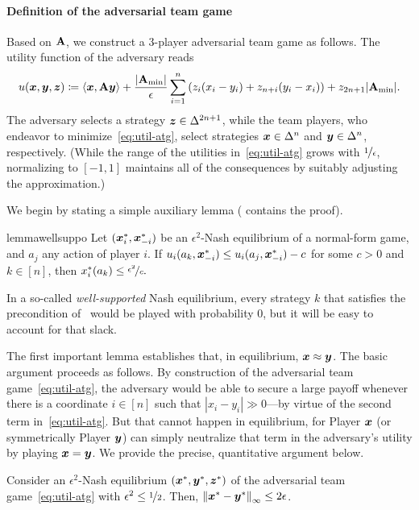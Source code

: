 \paragraph{Definition of the adversarial team game} Based on $\mathbf{A}$, we construct a $3$-player adversarial team game as follows. The utility function of the adversary reads
\begin{equation}
    \label{eq:util-atg}
    u({\bm{x}}, {\bm{y}}, {\bm{z}}) \coloneqq  \langle {\bm{x}}, \mathbf{A} {\bm{y}} \rangle  + \frac{|\mathbf{A}_{\min}|}{\epsilon} \sum_{i = 1}^n \left(z_i(x_i - y_i) + z_{n + i} (y_i - x_i)\right) + z_{2n+1} |\mathbf{A}_{\min}|.
\end{equation}
The adversary selects a strategy $ {\bm{z}} \in \Delta^{2n + 1}$, while the team players, who endeavor to minimize~\eqref{eq:util-atg}, select strategies ${\bm{x}} \in \Delta^n$ and ${\bm{y}} \in \Delta^n$, respectively. (While the range of the utilities in~\eqref{eq:util-atg} grows with $\nicefrac{1}{\epsilon}$, normalizing to $[-1, 1]$ maintains all of the consequences by suitably adjusting the approximation.)

We begin by stating a simple auxiliary lemma ( contains the proof).

\begin{restatable}{lemma}{wellsuppo}
    \label{lemma:mass_on_small_reward}
    Let $({\bm{x}}_i^*, {\bm{x}}^*_{-i})$ be an $\epsilon^2$-Nash equilibrium of a normal-form game, and $a_j$ any action of player $i$. If $u_i(a_k, {\bm{x}}^*_{-i}) \leq u_i(a_j, {\bm{x}}^*_{-i}) - c$ for some $c>0$ and $k \in [n]$, then $x^*_i(a_k) \leq \nicefrac{\epsilon^2}{c}.$
\end{restatable}

In a so-called \emph{well-supported} Nash equilibrium, every strategy $k$ that satisfies the precondition of~ would be played with probability $0$, but it will be easy to account for that slack.

The first important lemma establishes that, in equilibrium, ${\bm{x}} \approx {\bm{y}}$. The basic argument proceeds as follows. By construction of the adversarial team game~\eqref{eq:util-atg}, the adversary would be able to secure a large payoff whenever there is a coordinate $i \in [n]$ such that $|x_i - y_i| \gg 0$---by virtue of the second term in~\eqref{eq:util-atg}. But that cannot happen in equilibrium, for Player ${\bm{x}}$ (or symmetrically Player ${\bm{y}}$) can simply neutralize that term in the adversary's utility by playing ${\bm{x}} = {\bm{y}}$. We provide the precise, quantitative argument below.

\begin{lemma} \label{lemma:closeness}
    Consider an $\epsilon^2$-Nash equilibrium $({\bm{x}}^*, {\bm{y}}^*, {\bm{z}}^*)$ of the adversarial team game~\eqref{eq:util-atg} with $\epsilon^2 \leq \nicefrac{1}{2}$. Then, $\left\| {\bm{x}}^* - {\bm{y}}^* \right\|_{\infty} \leq 2\epsilon$.
\end{lemma}

